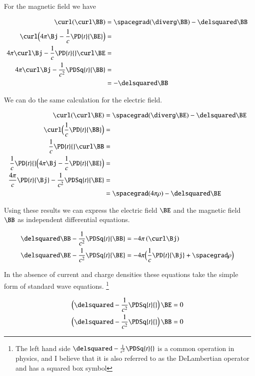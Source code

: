 For the magnetic field we have

\begin{align*}
\curl (\curl \BB) 			&= \spacegrad (\diverg \BB) - \delsquared \BB \\
\curl \Bigl(4\pi\Bj - \frac{1}{c} \PD{t}{\BE} \Bigr) 	&= \\
4\pi\curl \Bj - \frac{1}{c} \PD{t}{} \curl \BE 	&= \\
4\pi\curl \Bj - \frac{1}{c^2} \PDSq{t}{\BB} &= \\
      	     				&= - \delsquared \BB
\end{align*}

We can do the same calculation for the electric field.

\begin{align*}
\curl (\curl \BE) &= \spacegrad (\diverg \BE) - \delsquared \BE \\
\curl \Bigl(\frac{1}{c} \PD{t}{\BB}\Bigr) &= \\
\frac{1}{c} \PD{t}{} \curl \BB &= \\
\frac{1}{c} \PD{t}{} \Bigl(4\pi \Bj - \frac{1}{c} \PD{t}{\BE} \Bigr) &= \\
\frac{4\pi}{c} \PD{t}{\Bj} - \frac{1}{c^2} \PDSq{t}{\BE} &= \\
             &= \spacegrad (4\pi\rho) - \delsquared \BE \\
\end{align*}

Using these results we can express the 
electric field $\BE$ and the
magnetic field $\BB$
as independent differential equations.

\begin{align*}
\delsquared \BB - \frac{1}{c^2} \PDSq{t}{\BB} &= - 4\pi \left(\curl \Bj\right) \\
\delsquared \BE - \frac{1}{c^2} \PDSq{t}{\BE} &= - 4\pi \Bigl(\frac{1}{c} \PD{t}{\Bj} + \spacegrad \rho\Bigr)
\end{align*}

In the absence of current and charge densities these equations take the simple form of standard wave
equations.
\footnote{
The left hand side 
$
\delsquared - \frac{1}{c^2}\PDSq{t}{}
$
is a common operation in physics, and I believe that 
it is also referred to as the DeLambertian operator and has a squared box symbol
}

\begin{align*}
\Bigl(\delsquared - \frac{1}{c^2} \PDSq{t}{} \Bigr) \, \BE &= 0 \\
\Bigl(\delsquared - \frac{1}{c^2} \PDSq{t}{} \Bigr) \, \BB &= 0
\end{align*}

